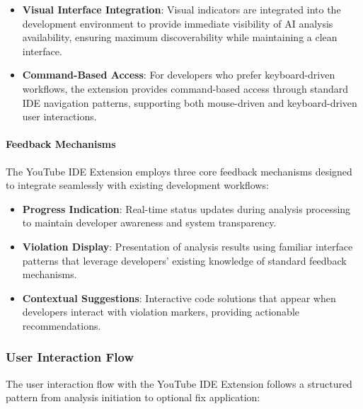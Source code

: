 \begin{spacing}{1.2}
\begin{itemize}
    \item \textbf{Visual Interface Integration}: Visual indicators are integrated into the development environment to provide immediate visibility of AI analysis availability, ensuring maximum discoverability while maintaining a clean interface.
    
    \item \textbf{Command-Based Access}: For developers who prefer keyboard-driven workflows, the extension provides command-based access through standard IDE navigation patterns, supporting both mouse-driven and keyboard-driven user interactions.
\end{itemize}

\paragraph{Feedback Mechanisms}
The YouTube IDE Extension employs three core feedback mechanisms designed to integrate seamlessly with existing development workflows:

\begin{itemize}
    \item \textbf{Progress Indication}: Real-time status updates during analysis processing to maintain developer awareness and system transparency.
    
    \item \textbf{Violation Display}: Presentation of analysis results using familiar interface patterns that leverage developers' existing knowledge of standard feedback mechanisms.
    
    \item \textbf{Contextual Suggestions}: Interactive code solutions that appear when developers interact with violation markers, providing actionable recommendations.
\end{itemize}


\subsubsection{User Interaction Flow}
The user interaction flow with the YouTube IDE Extension follows a structured pattern from analysis initiation to optional fix application:


\end{spacing}
